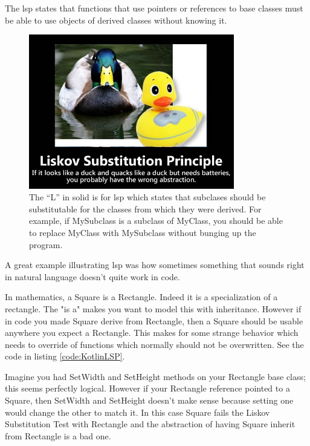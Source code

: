 \begin{framed}
	The \gls{lsp} states that functions that use pointers or references to base classes must be able to use objects of derived classes without knowing it.
\end{framed}
\begin{figure}
	\centering
	\includegraphics[width=0.8\textwidth]{images/kotlin/LSP.jpg}
	\caption{The “L” in \gls{solid} is for \gls{lsp} which states that subclases should be substitutable for the classes from which they were derived. For example, if MySubclass is a subclass of MyClass, you should be able to replace MyClass with MySubclass without bunging up the program.}
	\label{fir:LSP}
\end{figure}
A great example illustrating \gls{lsp}  was how sometimes something that sounds right in natural language doesn't quite work in code.

In mathematics, a Square is a Rectangle. Indeed it is a specialization of a rectangle. The "is a" makes you want to model this with inheritance. However if in code you made Square derive from Rectangle, then a Square should be usable anywhere you expect a Rectangle. This makes for some strange behavior which needs to override of functions which normally should not be overwritten. See the code in listing \ref{code:KotlinLSP}.




Imagine you had SetWidth and SetHeight methods on your Rectangle base class; this seems perfectly logical. However if your Rectangle reference pointed to a Square, then SetWidth and SetHeight doesn't make sense because setting one would change the other to match it. In this case Square fails the Liskov Substitution Test with Rectangle and the abstraction of having Square inherit from Rectangle is a bad one.

